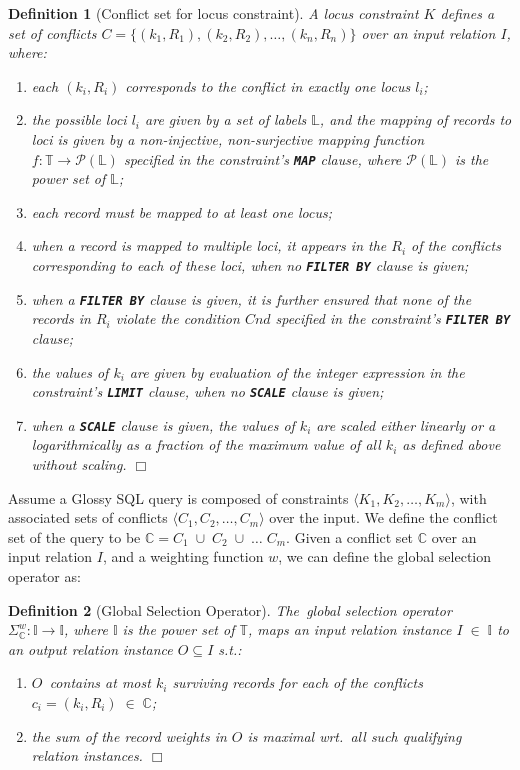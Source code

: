 \documentclass[11pt, oneside]{report}
\newtheorem{definition}{Definition}
\newcommand{\mathendbox}{\hfill$\Box$}
\begin{document}
{\begin{definition}[Conflict set for locus constraint]
A locus constraint $K$ defines a set of conflicts $C = \{ (k_1, R_1), (k_2, R_2), \ldots, (k_n, R_n) \}$ over an input relation $I$, where:
\begin{enumerate}[label=(\alph*)]
\item each $(k_i, R_i)$ corresponds to the conflict in exactly one locus $l_i$;
\item the possible loci $l_i$ are given by a set of labels $\mathbb{L}$, and the mapping of records to loci is given by a non-injective, non-surjective mapping function $f: \mathbb{T} \rightarrow \mathcal P (\mathbb{L})$ specified in the constraint's \textbf{\texttt{MAP}} clause, where $\mathcal P (\mathbb{L})$ is the power set of $\mathbb{L}$;
\item each record must be mapped to at least one locus;
\item when a record is mapped to multiple loci, it appears in the $R_i$ of the conflicts corresponding to each of these loci, when no \textbf{\texttt{FILTER BY}} clause is given;
\item when a \textbf{\texttt{FILTER BY}} clause is given, it is further ensured that none of the records in $R_i$ violate the condition $Cnd$ specified in the constraint's \textbf{\texttt{FILTER BY}} clause;
\item the values of $k_i$ are given by evaluation of the integer expression in the constraint's \textbf{\texttt{LIMIT}} clause, when no \textbf{\texttt{SCALE}} clause is given;
\item when a \textbf{\texttt{SCALE}} clause is given, the values of $k_i$ are scaled either linearly or a logarithmically as a fraction of the maximum value of all $k_i$ as defined above without scaling. 
\mathendbox 
\end{enumerate}
\label{def:conflict:set:locus}
\end{definition} 
 
Assume a Glossy SQL query is composed of constraints $\langle K_1, K_2, \ldots, K_m\rangle$, with associated sets of conflicts $\langle C_1, C_2, \ldots, C_m\rangle$ over the input. We define the conflict set of the query to be $\mathbb{C} = C_1 \;\cup\; C_2 \;\cup\; \ldots \; C_m$. Given a conflict set $\mathbb{C}$ over an input relation $I$, and a weighting function $w$, we can define the global selection operator as:
 
 \begin{definition}[Global Selection Operator]
The~global selection operator $\Sigma_{\mathbb{C}}^{w}: \mathbb{I} \rightarrow \mathbb{I}$, where $\mathbb{I}$ is the power set of $\mathbb{T}$, maps an input relation instance $I \; \in \; \mathbb{I}$ to an output relation instance $O \subseteq I$ s.t.:
\begin{enumerate}[label=(\alph*)]
\item $O$~contains at most $k_{i}$ surviving records for each of the conflicts $c_{i} = (k_{i},R_{i}) \; \in \; \mathbb{C}$;
\item the sum of the record weights in $O$ is maximal wrt.~all such qualifying relation instances.  \mathendbox 
\end{enumerate}
 \end{definition} 

}
\end{document}
